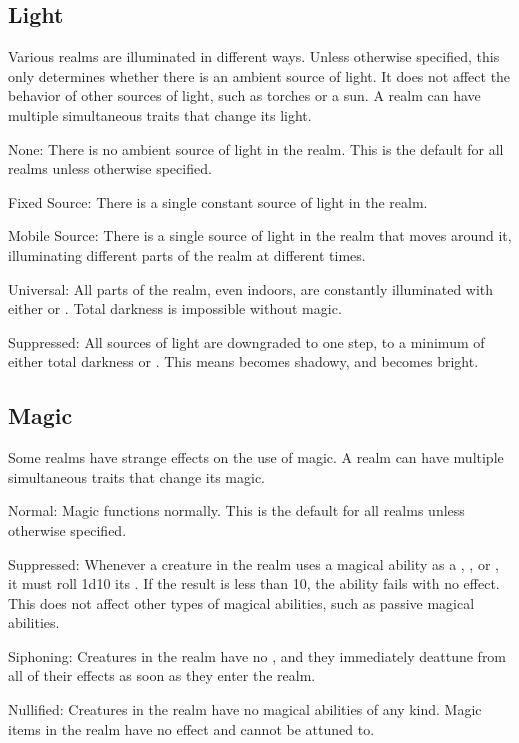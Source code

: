   \subsection{Light} Various realms are illuminated in different ways.
  Unless otherwise specified, this only determines whether there is an ambient source of light.
  It does not affect the behavior of other sources of light, such as torches or a sun.
  A realm can have multiple simultaneous traits that change its light.
    \begin{raggeditemize}
      \item None: There is no ambient source of light in the realm.
        This is the default for all realms unless otherwise specified.
      \item Fixed Source: There is a single constant source of light in the realm.
      \item Mobile Source: There is a single source of light in the realm that moves around it, illuminating different parts of the realm at different times.
      \item Universal: All parts of the realm, even indoors, are constantly illuminated with either  or .
        Total darkness is impossible without magic.
      \item Suppressed: All sources of light are downgraded to one step, to a minimum of either total darkness or .
        This means  becomes shadowy, and  becomes bright.
    \end{raggeditemize}

  \subsection{Magic} Some realms have strange effects on the use of magic.
  A realm can have multiple simultaneous traits that change its magic.
    \begin{raggeditemize}
      \item Normal: Magic functions normally.
        This is the default for all realms unless otherwise specified.
      \item Suppressed: Whenever a creature in the realm uses a magical ability as a , , or , it must roll 1d10 \add its .
        If the result is less than 10, the ability fails with no effect.
        This does not affect other types of magical abilities, such as passive magical abilities.
      \item Siphoning: Creatures in the realm have no , and they immediately deattune from all of their effects as soon as they enter the realm.
      \item Nullified: Creatures in the realm have no magical abilities of any kind.
        Magic items in the realm have no effect and cannot be attuned to.
    \end{raggeditemize}

